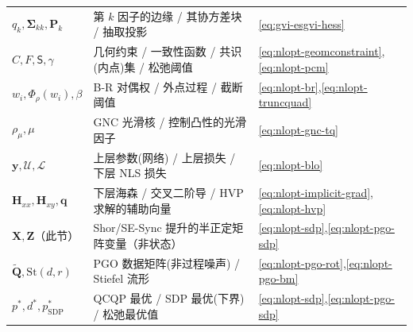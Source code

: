 \begin{table}[H]
\begin{tabular}{lll}
$q_k,\boldsymbol{\Sigma}_{kk},\mathbf{P}_k$ & 第 $k$ 因子的边缘 / 其协方差块 / 抽取投影 & \cref{eq:gvi-esgvi-hess} \\
$C,F,\mathsf{S},\gamma$ & 几何约束 / 一致性函数 / 共识(内点)集 / 松弛阈值 & \cref{eq:nlopt-geomconstraint},\cref{eq:nlopt-pcm} \\
$w_i,\Phi_\rho(w_i),\beta$ & B-R 对偶权 / 外点过程 / 截断阈值 & \cref{eq:nlopt-br},\cref{eq:nlopt-truncquad} \\
$\rho_\mu,\mu$ & GNC 光滑核 / 控制凸性的光滑因子 & \cref{eq:nlopt-gnc-tq} \\
$\mathbf{y},\mathcal{U},\mathcal{L}$ & 上层参数(网络) / 上层损失 / 下层 NLS 损失 & \cref{eq:nlopt-blo} \\
$\mathbf{H}_{xx},\mathbf{H}_{xy},\mathbf{q}$ & 下层海森 / 交叉二阶导 / HVP 求解的辅助向量 & \cref{eq:nlopt-implicit-grad},\cref{eq:nlopt-hvp} \\
$\mathbf{X},\mathbf{Z}$（此节）& Shor/SE-Sync 提升的半正定矩阵变量（非状态） & \cref{eq:nlopt-sdp},\cref{eq:nlopt-pgo-sdp} \\
$\tilde{\mathbf{Q}},\mathrm{St}(d,r)$ & PGO 数据矩阵(非过程噪声) / Stiefel 流形 & \cref{eq:nlopt-pgo-rot},\cref{eq:nlopt-pgo-bm} \\
$p^*,d^*,p^*_{\mathrm{SDP}}$ & QCQP 最优 / SDP 最优(下界) / 松弛最优值 & \cref{eq:nlopt-sdp},\cref{eq:nlopt-pgo-sdp} \\
\bottomrule
\end{tabular}
\end{table}

